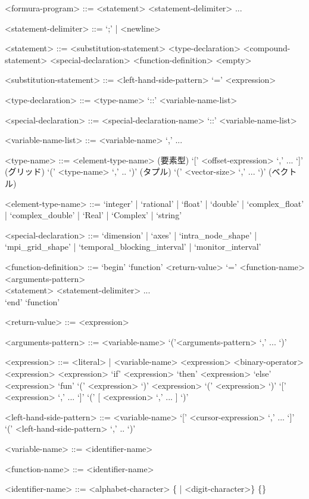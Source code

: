 \documentclass{jsarticle}
\begin{document}
\begin{grammar}
<formura-program> ::= <statement> <statement-delimiter> ...

<statement-delimiter> ::= `;' | <newline>

  <statement> ::= <substitution-statement> \alt
  <type-declaration> \alt
  <compound-statement> \alt
  <special-declaration> \alt
  <function-definition> \alt
 <empty>

 <substitution-statement> ::= <left-hand-side-pattern> `=' <expression>

 <type-declaration> ::= <type-name> `::' <variable-name-list>

 <special-declaration> ::= <special-declaration-name> `::' <variable-name-list>

 <variable-name-list> ::= <variable-name> `,' ...

<type-name> ::= <element-type-name>                  \hfill {(要素型)}
 `[' <offset-expression> `,' ... `]' \hfill {(グリッド)}
\alt `(' <type-name> `,' .. `)'                      \hfill {(タプル)}
 `(' <vector-size> `,' ... `)'                   \hfill {(ベクトル)}

<element-type-name> ::= `integer' | `rational' | `float' | `double'
| `complex_float' | `complex_double'
| `Real' | `Complex' | `string'

<special-declaration> ::= `dimension' | `axes' | `intra_node_shape' | `mpi_grid_shape' | `temporal_blocking_interval' | `monitor_interval'

<function-definition> ::=
  `begin' `function' <return-value> `=' <function-name> <arguments-pattern> \\
\hspace{2em}<statement> <statement-delimiter> ...  \\
    `end' `function'

<return-value> ::= <expression>

<arguments-pattern>     ::= <variable-name>
                         \alt  `('<arguments-pattern>  `,' ... `)'


<expression> ::= <literal> | <variable-name>
\alt <expression> <binary-operator> <expression>
 <expression>
\alt `if' <expression> `then' <expression> `else' <expression>
\alt `fun' `('  <expression>  `)' <expression>
\alt  `('  <expression>  `)'
 `[' <expression> `,' ... `]'
 `(' [ <expression> `,' ... ] `)'


  <left-hand-side-pattern> ::= <variable-name>
   `[' <cursor-expression> `,' ... `]'
  \alt `(' <left-hand-side-pattern> `,' .. `)'

<variable-name> ::= <identifier-name>

<function-name> ::= <identifier-name>

<identifier-name> ::= <alphabet-character> \{<alphabet-character> | <digit-character>\}
   \{<symbol-character>\}

\end{grammar}
\end{document}
